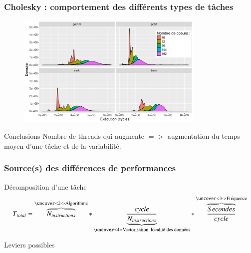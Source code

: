 \documentclass[xcolor={usenames,dvipsnames,svgnames,table}, aspectratio=43]{beamer}
\begin{document}
\begin{frame}
\frametitle{Cholesky : comportement des différents types de tâches}
\begin{figure}
  \includegraphics[width=0.8\textwidth]{graph/graph_distrib_overview_8192_224.pdf}
\end{figure}
 {
  \begin{block}{Conclusions}
    Nombre de threads qui augmente $=>$ augmentation du temps moyen d'une tâche et de la variabilité.
  \end{block}
}
\end{frame}


\begin{frame}
  \frametitle{Source(s) des différences de performances}

  \begin{block}{Décomposition d'une tâche}
    $$ T_{total} = \overbrace{N_{instructions}}^\text{\uncover<2->{Algorithme}} * \underbrace{\frac{cycle}{N_{instructions}}}_\text{\uncover<4>{Vectorisation, localité des données}} * \overbrace{\frac{Secondes}{cycle}}^\text{\uncover<3->{Fréquence}} $$
  \end{block}

  \begin{block}{Leviers possibles}
    \begin{itemize}
    \end{itemize}
  \end{block}

\end{frame}
\end{document}
